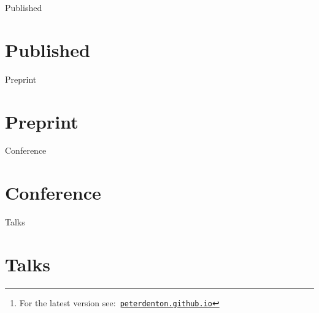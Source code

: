 \documentclass[a4paper,12pt]{article}
\title{\myTitle}
\author{\myName}
\date{\small Updated: \today\footnote{For the latest version see:\ \href{http://peterdenton.github.io}{\tt peterdenton.github.io}}}
\newcommand\myBib[1]{
\begin{btSect}{#1}
\section*{#1}
\btPrintAll
\end{btSect}}
\begin{document}
\makeatletter
\let\@fnsymbol\@arabic
\makeatother

\maketitle



\myBib{Published}
\myBib{Preprint}
\myBib{Conference}
\myBib{Talks}
\end{document}
